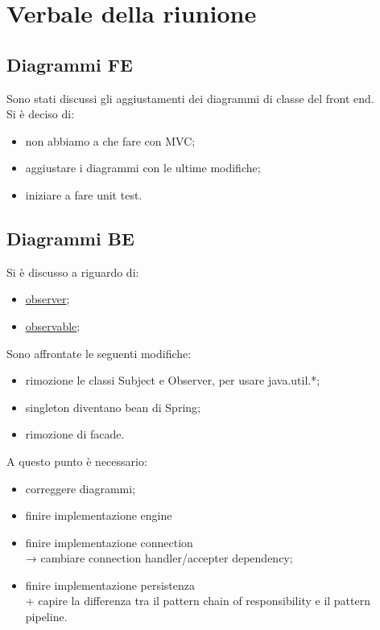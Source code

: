 \section{Verbale della riunione}

\subsection{Diagrammi FE}
Sono stati discussi gli aggiustamenti dei diagrammi di classe del front end.
\\Si è deciso di:
\begin{itemize}
	\item non abbiamo a che fare con MVC;
	\item aggiustare i diagrammi con le ultime modifiche;
	\item iniziare a fare unit test.
\end{itemize}


\subsection{Diagrammi BE}
Si è discusso a riguardo di:
\begin{itemize}
	\item \href{https://docs.oracle.com/javase/8/docs/api/java/util/Observer.html}{observer};
	\item \href{https://docs.oracle.com/javase/8/docs/api/java/util/Observable.html}{observable};
\end{itemize}
Sono affrontate le seguenti modifiche:
\begin{itemize}
	\item rimozione le classi Subject e Observer, per usare java.util.*;
	\item singleton diventano bean di Spring;
	\item rimozione di facade.
\end{itemize}
A questo punto è necessario:
\begin{itemize}
	\item correggere diagrammi;
	\item finire implementazione engine
	\item finire implementazione connection \\→ cambiare connection handler/accepter dependency;
	\item finire implementazione persistenza\\+ capire la differenza tra il pattern chain of responsibility e il pattern pipeline.
\end{itemize}

